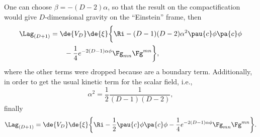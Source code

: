 One can choose $\beta = -(D-2) \alpha$, so that the result on the compactification would give $D$-dimensional gravity on the ``Einstein'' frame, then
\begin{align}
  \Lag_{(D+1)}
  &=  \de{V_D} \de{\xi} \bigg\{ \Ri - (D-1)(D-2) \alpha^2 \pau{c} \phi \pa{c} \phi
  \notag \\
  &\qquad - \frac{1}{4} e^{-2(D-1)\alpha\phi} \Fg_{mn} \Fg^{mn} \bigg\},%
\end{align}
where the other terms were dropped because are a boundary term. Additionally, in order to get the usual kinetic term for the scalar field, i.e., 
\begin{equation}
  \alpha^2 = \frac{1}{2} \frac{ 1 }{ (D-1)(D-2) },
\end{equation}
finally
\begin{equation}
  \Lag_{(D+1)} =  \de{V_D} \de{\xi} \biggl\{ \Ri - \frac{1}{2} \pau{c} \phi \pa{c} \phi - \frac{1}{4} e^{-2(D-1)\alpha \phi} \Fg_{mn} \Fg^{mn} \biggl\}.
\end{equation}
